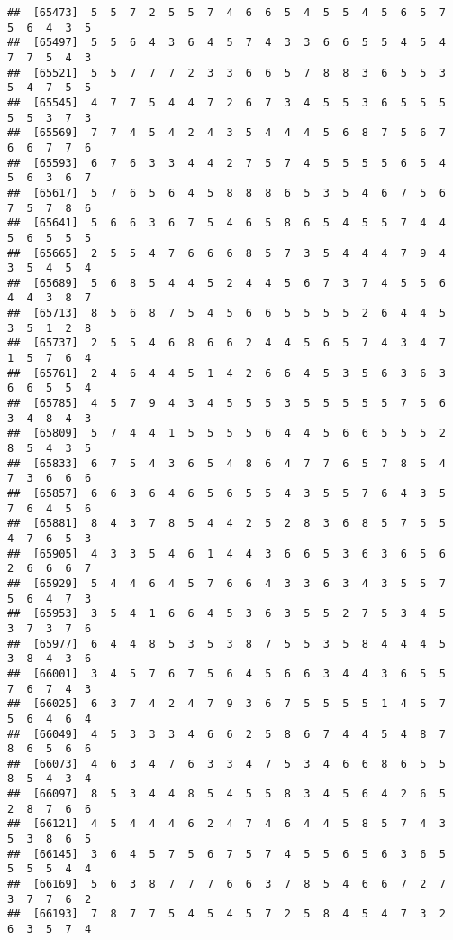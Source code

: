 \documentclass[
]{book}
\begin{document}
\begin{verbatim}
##  [65473]  5  5  7  2  5  5  7  4  6  6  5  4  5  5  4  5  6  5  7  5  6  4  3  5
##  [65497]  5  5  6  4  3  6  4  5  7  4  3  3  6  6  5  5  4  5  4  7  7  5  4  3
##  [65521]  5  5  7  7  7  2  3  3  6  6  5  7  8  8  3  6  5  5  3  5  4  7  5  5
##  [65545]  4  7  7  5  4  4  7  2  6  7  3  4  5  5  3  6  5  5  5  5  5  3  7  3
##  [65569]  7  7  4  5  4  2  4  3  5  4  4  4  5  6  8  7  5  6  7  6  6  7  7  6
##  [65593]  6  7  6  3  3  4  4  2  7  5  7  4  5  5  5  5  6  5  4  5  6  3  6  7
##  [65617]  5  7  6  5  6  4  5  8  8  8  6  5  3  5  4  6  7  5  6  7  5  7  8  6
##  [65641]  5  6  6  3  6  7  5  4  6  5  8  6  5  4  5  5  7  4  4  5  6  5  5  5
##  [65665]  2  5  5  4  7  6  6  6  8  5  7  3  5  4  4  4  7  9  4  3  5  4  5  4
##  [65689]  5  6  8  5  4  4  5  2  4  4  5  6  7  3  7  4  5  5  6  4  4  3  8  7
##  [65713]  8  5  6  8  7  5  4  5  6  6  5  5  5  5  2  6  4  4  5  3  5  1  2  8
##  [65737]  2  5  5  4  6  8  6  6  2  4  4  5  6  5  7  4  3  4  7  1  5  7  6  4
##  [65761]  2  4  6  4  4  5  1  4  2  6  6  4  5  3  5  6  3  6  3  6  6  5  5  4
##  [65785]  4  5  7  9  4  3  4  5  5  5  3  5  5  5  5  5  7  5  6  3  4  8  4  3
##  [65809]  5  7  4  4  1  5  5  5  5  6  4  4  5  6  6  5  5  5  2  8  5  4  3  5
##  [65833]  6  7  5  4  3  6  5  4  8  6  4  7  7  6  5  7  8  5  4  7  3  6  6  6
##  [65857]  6  6  3  6  4  6  5  6  5  5  4  3  5  5  7  6  4  3  5  7  6  4  5  6
##  [65881]  8  4  3  7  8  5  4  4  2  5  2  8  3  6  8  5  7  5  5  4  7  6  5  3
##  [65905]  4  3  3  5  4  6  1  4  4  3  6  6  5  3  6  3  6  5  6  2  6  6  6  7
##  [65929]  5  4  4  6  4  5  7  6  6  4  3  3  6  3  4  3  5  5  7  5  6  4  7  3
##  [65953]  3  5  4  1  6  6  4  5  3  6  3  5  5  2  7  5  3  4  5  3  7  3  7  6
##  [65977]  6  4  4  8  5  3  5  3  8  7  5  5  3  5  8  4  4  4  5  3  8  4  3  6
##  [66001]  3  4  5  7  6  7  5  6  4  5  6  6  3  4  4  3  6  5  5  7  6  7  4  3
##  [66025]  6  3  7  4  2  4  7  9  3  6  7  5  5  5  5  1  4  5  7  5  6  4  6  4
##  [66049]  4  5  3  3  3  4  6  6  2  5  8  6  7  4  4  5  4  8  7  8  6  5  6  6
##  [66073]  4  6  3  4  7  6  3  3  4  7  5  3  4  6  6  8  6  5  5  8  5  4  3  4
##  [66097]  8  5  3  4  4  8  5  4  5  5  8  3  4  5  6  4  2  6  5  2  8  7  6  6
##  [66121]  4  5  4  4  4  6  2  4  7  4  6  4  4  5  8  5  7  4  3  5  3  8  6  5
##  [66145]  3  6  4  5  7  5  6  7  5  7  4  5  5  6  5  6  3  6  5  5  5  5  4  4
##  [66169]  5  6  3  8  7  7  7  6  6  3  7  8  5  4  6  6  7  2  7  3  7  7  6  2
##  [66193]  7  8  7  7  5  4  5  4  5  7  2  5  8  4  5  4  7  3  2  6  3  5  7  4

\end{verbatim}
\end{document}
